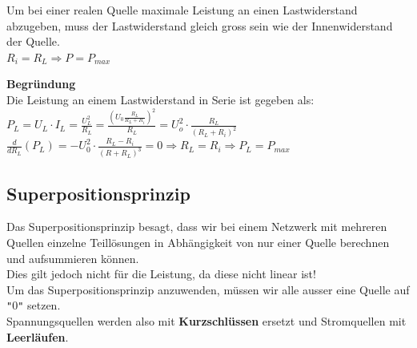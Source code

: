 					\beginip
					Um bei einer realen Quelle maximale Leistung an einen Lastwiderstand abzugeben, muss der Lastwiderstand gleich gross sein wie der Innenwiderstand der Quelle. \\
					\formulaBegin
					$ R_i = R_L \Rightarrow P = P_{max}$
					\formulaEnd
					\begin{center}
					\end{center}
					\iend

\newpage
					\textbf{Begründung} \\
					Die Leistung an einem Lastwiderstand in Serie ist gegeben als: \\
					$ \displaystyle P_L = U_L \cdot I_L = \frac{U_L^2}{R_L} = \frac{( U_0 \frac{R_L}{R_L + R_i})^2}{R_L} = U_o^2 \cdot \frac{R_L}{(R_L + R_i)^2}$ \\
					$\displaystyle \frac{d}{dR_L} (P_L) = - U_0^2 \cdot \frac{R_L - R_i}{(R + R_L)^3} = 0 \Rightarrow R_L = R_i  \Rightarrow P_L = P_{max}$

					\subsection{Superpositionsprinzip}

					 Das Superpositionsprinzip besagt, dass wir bei einem Netzwerk mit mehreren Quellen einzelne Teillösungen in Abhängigkeit von nur einer Quelle berechnen und aufsummieren können. \\
					 Dies gilt jedoch nicht für die Leistung, da diese nicht linear ist! \\
					 Um das Superpositionsprinzip anzuwenden, müssen wir alle ausser eine Quelle auf \texttt{"}0\texttt{"} setzen. \\
					 Spannungsquellen werden also mit \textbf{Kurzschlüssen} ersetzt und Stromquellen mit \textbf{Leerläufen}. \\
					 \begin{center}
					 	\fix
					 \end{center}


